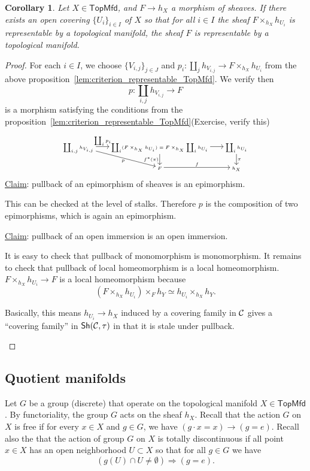 \documentclass{tufte-book} %
\numberwithin{dummy}{section}
\newtheorem{cor}[thm]{Corollary}
\newcommand{\calc}{{\cal C}}
\newcommand{\Lrta}{\Longrightarrow}
\newcommand{\lrta}{\longrightarrow}
\begin{document}
\begin{cor}\label{cor:criterion_representable}
Let $X\in\mathsf{TopMfd}$, and $F\lrta h_X$ a morphism of sheaves. If there exists an open covering $\{U_i\}_{i\in I}$ of $X$ so that for all $i\in I$ the sheaf $F\times_{h_X} h_{U_i}$ is representable by a topological manifold, the sheaf $F$ is representable by a topological manifold.
\end{cor}
\begin{proof}
For each $i\in I$, we choose $\{V_{i,j}\}_{j\in J}$ and $p_i:\coprod_j h_{V_{i,j}}\lrta F\times_{h_X} h_{U_i}$ from the above proposition~\ref{lem:criterion_representable_TopMfd}. We verify then
$$
p:\coprod_{i,j}h_{V_{i,j}}\lrta F
$$
is a morphism satisfying the conditions from the proposition~\ref{lem:criterion_representable_TopMfd}(Exercise, verify this){\color{gray}\begin{marginfigure}$$
\tiny
\begin{tikzcd}
\coprod_{i,j}h_{V_{i,j}} \arrow[r, "\coprod_ip_i"] \arrow[rd, "p"'] & \coprod_i(F\times_{h_X} h_{U_i})=F\times_{h_X}\coprod_i h_{U_i} \arrow[d, "f^*(\pi)"'] \arrow[r] & \coprod_ih_{U_i} \arrow[d, "\pi"] \\
 & F \arrow[r, "f"] & h_X
\end{tikzcd}
$$
\underline{Claim}: pullback of an epimorphism of sheaves is an epimorphism. 

This can be checked at the level of stalks. Therefore $p$ is the composition of two epimorphisms, which is again an epimorphism.

\underline{Claim}: pullback of an open immersion is an open immersion.

It is easy to check that pullback of monomorphism is monomorphism. It remains to check that pullback of local homeomorphism is a local homeomorphism. $F\times_{h_X} h_{U_i}\lrta F$ is a local homeomorphism because 
$$
(F\times_{h_X} h_{U_i})\times_{F} h_Y\simeq h_{U_i}\times_{h_X} h_Y. 
$$

Basically, this means $h_{U_i}\lrta h_X$ induced by a covering family in $\calc$ gives a ``covering family'' in $\mathsf{Sh}(\calc,\tau)$ in that it is stale under pullback.
\end{marginfigure}}
\end{proof}
\subsection{Quotient manifolds}
Let $G$ be a group (discrete) that operate on the topological manifold $X\in \mathsf{TopMfd}$. By functoriality, the group $G$ acts on the sheaf $h_X$. Recall that the action $G$ on $X$ is free if for every $x\in X$ and $g\in G$, we have $(g\cdot x=x)\lrta (g=e)$. Recall also the that the action of group $G$ on $X$ is totally discontinuous if all point $x\in X$ has an open neighborhood $U\subset X$ so that for all $g\in G$ we have
$$
(g(U)\cap U\neq \emptyset)\Lrta (g=e).
$$
\end{document}
